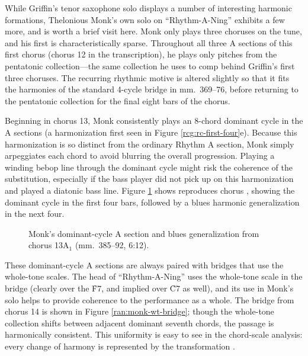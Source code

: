 While Griffin's tenor saxophone solo displays a number of interesting harmonic
formations, Thelonious Monk's own solo on ``Rhythm-A-Ning'' exhibits a few
more, and is worth a brief visit here. Monk only plays three choruses on the
tune, and his first is characteristically sparse. Throughout all three A
sections of this first chorus (chorus 12 in the transcription), he plays only
pitches from the \Bflat pentatonic collection---the same collection he uses to
comp behind Griffin's first three choruses. The recurring rhythmic
motive is altered slightly so that it fits the harmonies of the standard
4-cycle bridge in mm.~369--76, before returning to the \Bflat pentatonic
collection for the final eight bars of the chorus.

Beginning in chorus 13, Monk consistently plays an 8-chord dominant cycle in
the A sections (a harmonization first seen in Figure
\ref{rcg:rc-first-four}e). Because this harmonization is so distinct from the
ordinary Rhythm A section, Monk simply arpeggiates each chord to avoid
blurring the overall progression. Playing a winding bebop line through the
dominant cycle might risk the coherence of the substitution, especially if the
bass player did not pick up on this harmonization and played a \Bflat diatonic
bass line. Figure \ref{ran:monk-cycle-a} shows reproduces chorus
, showing the dominant cycle in the first four bars, followed by a
\Bflat blues harmonic generalization in the next four.

\begin{figure}[tbp]
  \caption[Monk's dominant-cycle A section and blues generalization.]{%
    Monk's dominant-cycle A section and blues generalization from chorus
    13A$_1$ (mm.~385--92, 6:12).}
  \label{ran:monk-cycle-a}
\end{figure}

These dominant-cycle A sections are always paired with bridges that use the
whole-tone scales. The head of ``Rhythm-A-Ning'' uses the whole-tone scale in
the bridge (clearly over the \h{F7}, and implied over \h{C7} as well), and its
use in Monk's solo helps to provide coherence to the performance as a whole.
The bridge from chorus 14 is shown in Figure \ref{ran:monk-wt-bridge}; though
the whole-tone collection shifts between adjacent dominant seventh chords, the
passage is harmonically consistent. This uniformity is easy to see in the
chord-scale analysis: every change of harmony is represented by the
transformation .

